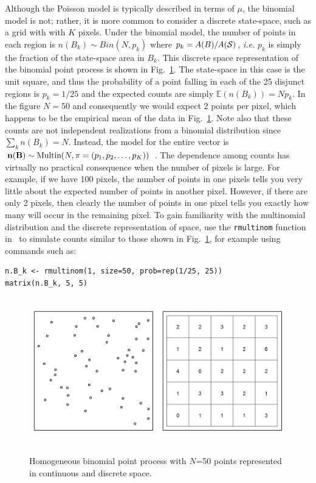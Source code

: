 Although the Poisson model is typically described in terms of $\mu$,
the binomial model is not; rather, it
is more common to consider a discrete state-space, such as a grid with
with $K$ pixels. Under the binomial model, the number of points in
each region is $n(B_k) \sim Bin(N, p_k)$
where $p_k = A(B)/A(\cal{S})$, \emph{i.e.} $p_k$ is simply the fraction of
the state-space area in $B_k$. This discrete space representation of
the binomial point process is shown in Fig.~\ref{ch9.fig.homo}. The
state-space in this case is the unit square, and thus the probability of a
point falling in each of the 25 disjunct regions is $p_k = 1/25$ and
the expected counts are simply $\mathbb{E}(n(B_k)) = Np_k$. In
the figure $N=50$ and consequently we would expect 2 points per pixel, which
happens to be the empirical mean of the data in
Fig.~\ref{ch9.fig.homo}. Note also that these counts are not
independent realizations from a binomial distribution since $\sum_k
n(B_k) = N$. Instead, the model for the entire vector
is ${\bf n(B)} \sim \mbox{Multin}(N, {\mathbf{\pi}} = (p_1, p_2, \dots,
p_K))$ \citep{illian_etal:2008}. The dependence among counts has virtually
no practical consequence when the number of pixels is large. For
example, if we have 100 pixels, the number of points in one pixels
tells you very little about the expected number of points in another
pixel. However, if there are only 2 pixels, then clearly the number of
points in one pixel tells you exactly how many will occur in the
remaining pixel. To gain familiarity with the multinomial distribution
and the discrete representation of space, use the \verb+rmultinom+
function in \R~to simulate counts similar to those shown in
Fig.~\ref{ch9.fig.homo}, for example using commands
such as:

\begin{verbatim}
n.B_k <- rmultinom(1, size=50, prob=rep(1/25, 25))
matrix(n.B_k, 5, 5)
\end{verbatim}


\begin{figure}
\centering
\includegraphics[width=5in,height=2.5in]{Ch11/figs/homoPlots}
\label{ch9.fig.homo}
\caption{Homogeneous binomial point process with $N$=50 points
  represented in continuous and discrete space.}
\end{figure}


